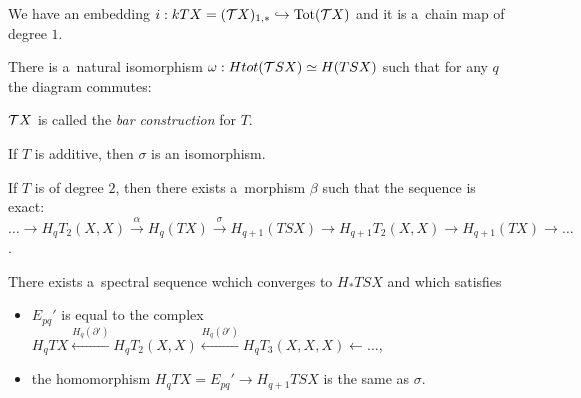     \begin{proposition}
        We have an embedding $i:kTX = ({\mathcal{T}}  X)_{1,\ast} 
            \hookrightarrow {\mathrm{Tot}}({\mathcal{T}}  X)$
        and it is a~chain map of degree $1$.
    \end{proposition}
    
    \begin{theorem}
        There is a~natural isomorphism 
        $\omega: H tot({\mathcal{T}}  S X) \simeq H(TSX)$
        such that for any $q$ the diagram commutes:
    \end{theorem}
    
    \begin{definition}
        ${\mathcal{T}} X$ is called the {\em bar construction} for $T$.
    \end{definition}
    
    \begin{corollary}
        If $T$ is additive, then $\sigma$ is an isomorphism.
    \end{corollary}
    
    \begin{corollary}
        If $T$ is of degree $2$, then there exists a~morphism $\beta$
        such that the sequence is exact:
        $\ldots \to H_q T_2(X,X) \xrightarrow \alpha H_q(TX)
        \xrightarrow \sigma H_{q+1}(TSX)
        \to H_{q+1} T_2(X,X) \to H_{q+1}(TX) \to \ldots$.
    \end{corollary}
    
    \begin{corollary}
        There exists a~spectral sequence wchich converges to $H_\ast TSX$ 
        and which satisfies
        \begin{itemize}
            \item $E_{pq}'$ is equal to the complex
            $H_q TX \xleftarrow{H_q(\partial')} H_q T_2(X,X)
            \xleftarrow{H_q(\partial')} H_q T_3(X,X,X) \xleftarrow{} \ldots$,
            \item the homomorphism
            $H_qTX = E_{pq}' \to H_{q+1}TSX$ is the same as $\sigma$.
        \end{itemize}
    \end{corollary}
    
